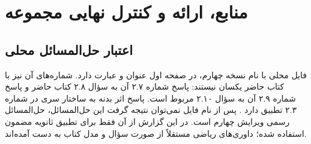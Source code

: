 \documentclass[12pt,a4paper]{article}
\newcommand{\exnum}[1]{\mbox{\beginL#1\endL}}
\begin{document}
\section*{منابع، ارائه و کنترل نهایی مجموعه}
\subsection*{اعتبار حل‌المسائل محلی}
فایل محلی با نام نسخه چهارم، در صفحه اول عنوان  و عبارت  دارد. شماره‌های آن نیز با کتاب حاضر یکسان نیستند: پاسخ شماره \exnum{۲.۷} آن به سؤال \exnum{۲.۸} کتاب حاضر و پاسخ شماره \exnum{۲.۹} آن به سؤال \exnum{۲.۱۰} مربوط است. پاسخ اثر بدنه به ساختار سری در شماره \exnum{۲.۳} تطبیق دارد \cite[صفحات ۱، ۴ و ۵ فایل]{manual}. پس از نام فایل نمی‌توان نتیجه گرفت این حل‌المسائل، حل‌المسائل رسمی ویرایش چهارم است. در این گزارش از آن فقط برای تطبیق ثانویه مضمون استفاده شده؛ داوری‌های ریاضی مستقلاً از صورت سؤال و مدل کتاب به دست آمده‌اند.
\end{document}
